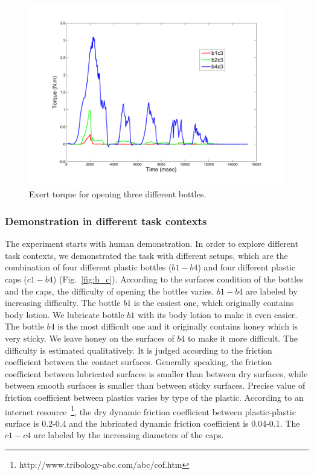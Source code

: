 \begin{figure}
  \centering
  \includegraphics[width=12cm]{./fig_cha4/b1b3b4_time_T_2.pdf}
  \caption{ \scriptsize{Exert torque for opening three different bottles.}
}
\label{fig:bottlepatterns}
\end{figure}


\subsubsection{Demonstration in different task contexts}
\label{cha4:sec3:experimentsetup:taskcontexts}
The experiment starts with human demonstration. In order to explore different task contexts, we demonstrated the task with different setups, which are the combination of four different plastic bottles ($b1-b4$) and four different plastic caps ($c1-b4$) (Fig.~\ref{fig:b_c}).
According to the surfaces condition of the bottles and the caps, the difficulty of opening the bottles varies. $b1-b4$ are labeled by increasing difficulty. The bottle $b1$ is the easiest one, which originally contains body lotion. We lubricate bottle $b1$ with its body lotion to make it even easier. The bottle $b4$ is the most difficult one and it originally contains honey which is very sticky. We leave honey on the surfaces of $b4$ to make it more difficult. The difficulty is estimated qualitatively. It is judged according to the friction coefficient between the contact surfaces. Generally speaking, the friction coefficient between lubricated surfaces is smaller than between dry surfaces, while between smooth  surfaces is smaller than between sticky surfaces. Precise value of friction coefficient between plastics varies by type of the plastic. According to an internet resource~\footnote{http://www.tribology-abc.com/abc/cof.htm}, the dry dynamic friction coefficient between plastic-plastic surface is 0.2-0.4 and the lubricated dynamic friction coefficient is 0.04-0.1. The $c1-c4$ are labeled by the increasing diameters of the caps.


